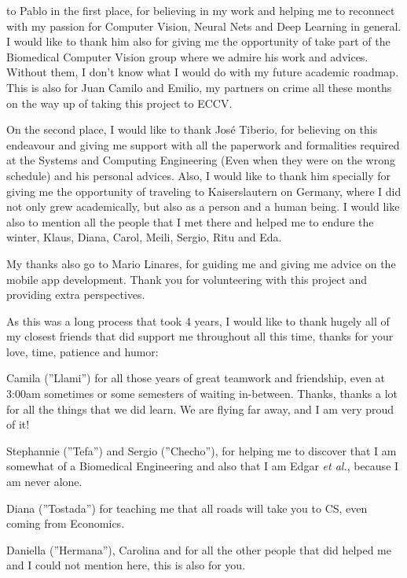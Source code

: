 
 to Pablo in the first place, for believing in my work and helping me to reconnect with my passion for Computer Vision, Neural Nets and Deep Learning in general. I would like to thank him also for giving me the opportunity of take part of the Biomedical Computer Vision group where we admire his work and advices. Without them, I don't know what I would do with my future academic roadmap. This is also for Juan Camilo and Emilio, my partners on crime all these months on the way up of taking this project to ECCV.

On the second place, I would like to thank José Tiberio, for believing on this endeavour and giving me support with all the paperwork and formalities required at the Systems and Computing Engineering (Even when they were on the wrong schedule) and his personal advices. Also, I would like to thank him specially for giving me the opportunity of traveling to Kaiserslautern on Germany, where I did not only grew academically, but also as a person and a human being. I would like also to mention all the people that I met there and helped me to endure the winter, Klaus, Diana, Carol, Meili, Sergio, Ritu and Eda.

My thanks also go to Mario Linares, for guiding me and giving me advice on the mobile app development. Thank you for volunteering with this project and providing extra perspectives.

As this was a long process that took 4 years, I would like to thank hugely all of my closest friends that did support me throughout all this time, thanks for your love, time, patience and humor: 

Camila (''Llami'') for all those years of great teamwork and friendship, even at 3:00am sometimes or some semesters of waiting in-between. Thanks, thanks a lot for all the things that we did learn. We are flying far away, and I am very proud of it!

Stephannie (''Tefa'') and Sergio (''Checho''), for helping me to discover that I am somewhat of a Biomedical Engineering and also that I am Edgar \textit{et al.}, because I am never alone.

Diana (''Tostada'') for teaching me that all roads will take you to CS, even coming from Economics.

Daniella (''Hermana''), Carolina and for all the other people that did helped me and I could not mention here, this is also for you.

